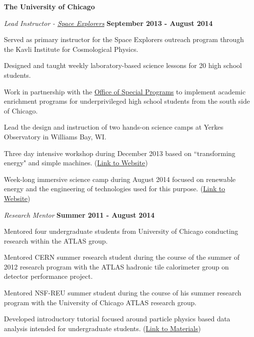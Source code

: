 \documentclass[10pt]{article}
\newenvironment{outerlist}[1][\enskip\textbullet]%
        {\begin{itemize}[#1]}{\end{itemize}%
         \vspace{-.6\baselineskip}}
\newenvironment{innerlist}[1][\enskip\textbullet]%
        {\begin{compactitem}[#1]}{\end{compactitem}}
\begin{document}
\vspace{3mm}

\textbf{The University of Chicago}
\begin{outerlist}
\item[] \textit{Lead Instructor - \href{http://kicp.uchicago.edu/education/explorers/}{Space Explorers}}%
    \hfill \textbf{September 2013 - August 2014}
    \begin{innerlist}
        \item Served as primary instructor for the Space Explorers outreach program through the Kavli Institute for Cosmological Physics.
        \item Designed and taught weekly laboratory-based science lessons for 20 high school students.
	\item Work in partnership with the \href{https://osp-cp.uchicago.edu/}{Office of Special Programs} to implement academic enrichment programs for underprivileged high school students from the south side of Chicago.
        \item Lead the design and instruction of two hands-on science camps at Yerkes Observatory in Williams Bay, WI. 
        \begin{innerlist}
		\item Three day intensive workshop during December 2013 based on ``transforming energy" and simple machines.  (\href{http://kicp.uchicago.edu/events/kicp_yerkes.html#id_392}{Link to Website})
        	\item Week-long immersive science camp during August 2014 focused on renewable energy and the engineering of technologies used for this purpose. (\href{http://kicp.uchicago.edu/events/kicp_yerkes.html#id_443}{Link to Website})
        \end{innerlist}
    \end{innerlist}
\item[] \textit{Research Mentor}%
    \hfill \textbf{Summer 2011 - August 2014}
    \begin{innerlist}
        \item Mentored four undergraduate students from University of Chicago conducting research within the ATLAS group.
        \item Mentored CERN summer research student during the course of the summer of 2012 research program with the ATLAS hadronic tile calorimeter group on detector performance project. 
        \item Mentored NSF-REU summer student during the course of his summer research program with the University of Chicago ATLAS research group. 
        \item Developed introductory tutorial focused around particle physics based data analysis intended for undergraduate students. (\href{https://github.com/smeehan12/StandaloneAnalysisTutorial/blob/master/StandaloneAnalysisTutorial.pdf}{Link to Materials})
    \end{innerlist}
    

\end{outerlist}
\end{document}
